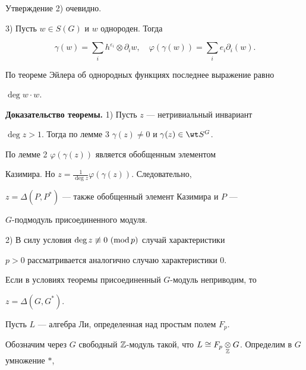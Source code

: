 Утверждение 2) очевидно. 


 


3) Пусть $w\in S(G)$ и $w$ однороден. Тогда 


$$ 


\gamma(w)=\sum_i h^{\varepsilon_i}\otimes \partial_i w,\quad 


\varphi(\gamma(w))=\sum_i e_i\partial_i(w). 


$$ 


По теореме Эйлера об однородных функциях последнее выражение равно 


$\deg w\cdot w$. 


\medskip 


 


{\bf Доказательство теоремы.} 1) Пусть $z$ --- нетривиальный инвариант 


$\deg z>1$. Тогда по лемме 3\; $\gamma(z)\ne0$ и $\gamma(z)\in\wt S^G$. 


По лемме 2\; $\varphi(\gamma(z))$ является обобщенным элементом 


Казимира. Но $z=\frac{1}{\deg z}\varphi(\gamma(z))$. Следовательно, 


$z=\Delta(P,P^*)$ --- также обобщенный элемент Казимира и $P$ --- 


$G$-подмодуль присоединенного модуля. 


 


2) В силу условия $\deg z\not\equiv0\ (\operatorname{mod} p)$ случай характеристики 


$p>0$ рассматривается аналогично случаю характеристики 0.


 


\begin{cor} 


Если в условиях теоремы присоединенный $G$-модуль неприводим, то 


$z=\Delta(G,G^*)$. 


\end{cor} 


 


Пусть $L$ --- алгебра Ли, определенная над простым полем $F_p$. 


Обозначим через $G$ свободный $\Bbb Z$-модуль такой, что $L\cong 


F_p\underset{\Bbb Z}{\otimes}{}G$. Определим в $G$ умножение $*$, 



